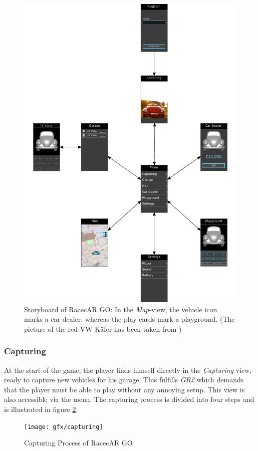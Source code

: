 \begin{figure}[btph]
  \centering
        \includegraphics[width=.8\linewidth]{gfx/storyboard}
        \caption{Storyboard of RacecAR GO: In the \emph{Map}-view, the vehicle icon marks a car dealer, whereas the play cards mark a playground. (The picture of the red VW K\"afer has been taken from \citep{kaeferPicture})}
        \label{fig:storyboard}
\end{figure}

\subsubsection{Capturing}
At the start of the game, the player finds himself directly in the \emph{Capturing} view, ready to capture new vehicles for his garage. This fulfills \emph{GR2} which demands that the player must be able to play without any annoying setup. This view is also accessible via the menu. The capturing process is divided into four steps and is illustrated in figure \ref{fig:capturing}.

\begin{figure}[btph]
  \centering
        \texttt{[image: gfx/capturing]}
        \caption{Capturing Process of RacecAR GO}
        \label{fig:capturing}
\end{figure}

